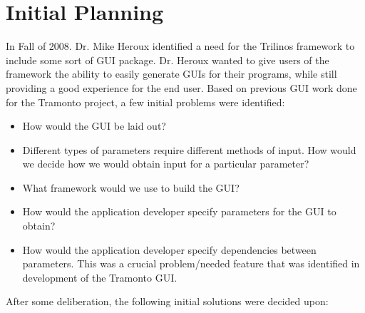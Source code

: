 \section{Initial Planning}
In Fall of 2008. Dr. Mike Heroux identified a need for
the Trilinos framework to include some sort of GUI package. Dr. Heroux wanted 
to give users of the framework the ability to easily generate GUIs for their
programs, while still providing a good experience for the end user. Based on
previous GUI work done for the Tramonto project, a few initial problems were
identified:

	\begin{itemize}
		\item How would the GUI be laid out?
		\item Different types of parameters require different methods of input.
			How would we decide how we would obtain input for a particular
			parameter?
		\item What framework would we use to build the GUI?
		\item How would the application developer specify parameters for the
			GUI to obtain?
		\item How would the application developer specify dependencies between
		parameters. This was a crucial problem/needed feature that was identified in
		development of the Tramonto GUI.
	\end{itemize}

After some deliberation, the following initial solutions were decided upon:

